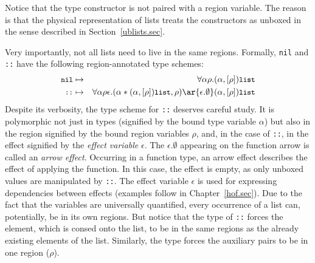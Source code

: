 \documentclass[12pt]{book}
\begin{document}
Notice that the  type constructor is not paired with a region variable.
The reason is that the physical representation of lists treats the constructors
as unboxed in the sense described in Section~\ref{ublists.sec}.

Very importantly, not all lists need to live in the same regions.  Formally,
\lstinline{nil} and \lstinline{::} have the following region-annotated type
schemes:
\begin{eqnarray*}
\kw{nil} & \mapsto & \forall\alpha\rho.(\alpha,[\rho])\kw{list}\\
\kw{::}  & \mapsto & \forall\alpha\rho\epsilon.(\alpha\ast(\alpha,[\rho])\kw{list},\rho)
\ar{\epsilon.\emptyset} (\alpha,[\rho])\kw{list}
\end{eqnarray*}
Despite its verbosity, the type scheme for \lstinline{::} deserves careful
study. It is polymorphic not just in types (signified by the bound type variable
$\alpha$) but also in the region signified by the bound region variables $\rho$,
and, in the case of \lstinline{::}, in the effect signified by the
%
%
\emph{effect variable} $\epsilon$.  The $\epsilon.\emptyset$ appearing on the
function arrow is called an
%
%
{\em arrow effect}.  Occurring in a function type, an arrow effect describes the
effect of applying the function.  In this case, the effect is empty, as only
unboxed values are manipulated by \lstinline{::}.  The effect variable
$\epsilon$ is used for expressing dependencies between effects (examples follow
in Chapter~\ref{hof.sec}). Due to the fact that the variables are universally
quantified, every occurrence of a list can, potentially, be in its own
regions. But notice that the type of \lstinline{::} forces the element, which is
consed onto the list, to be in the same regions as the already existing elements
of the list.  Similarly, the type forces the auxiliary pairs to be in one region
($\rho$).
\end{document}
